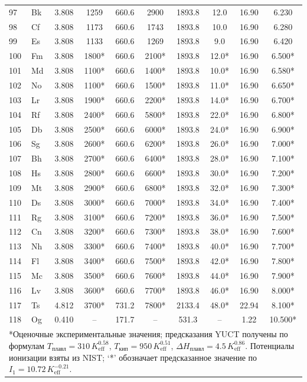 \documentclass[12pt,a4paper]{article}
\theoremstyle{remark}
\begin{document}
\begin{longtable}{@{}llcccccccc@{}}
		97 & Bk  & 3.808 & 1259   & 660.6  & 2900   & 1893.8 & 12.0  & 16.90 & 6.230 \\
		98 & Cf  & 3.808 & 1173   & 660.6  & 1743   & 1893.8 & 10.0  & 16.90 & 6.280 \\
		99 & Es  & 3.808 & 1133   & 660.6  & 1269   & 1893.8 & 9.0   & 16.90 & 6.420 \\
		100& Fm  & 3.808 & 1800*  & 660.6  & 2100*  & 1893.8 & 12.0* & 16.90 & 6.500* \\
		101& Md  & 3.808 & 1100*  & 660.6  & 1400*  & 1893.8 & 10.0* & 16.90 & 6.580* \\
		102& No  & 3.808 & 1100*  & 660.6  & 1500*  & 1893.8 & 11.0* & 16.90 & 6.650* \\
		103& Lr  & 3.808 & 1900*  & 660.6  & 2200*  & 1893.8 & 14.0* & 16.90 & 6.700* \\
		104& Rf  & 3.808 & 2400*  & 660.6  & 5800*  & 1893.8 & 22.0* & 16.90 & 6.800* \\
		105& Db  & 3.808 & 2500*  & 660.6  & 6000*  & 1893.8 & 24.0* & 16.90 & 6.900* \\
		106& Sg  & 3.808 & 2600*  & 660.6  & 6200*  & 1893.8 & 26.0* & 16.90 & 7.000* \\
		107& Bh  & 3.808 & 2700*  & 660.6  & 6400*  & 1893.8 & 28.0* & 16.90 & 7.100* \\
		108& Hs  & 3.808 & 2800*  & 660.6  & 6600*  & 1893.8 & 30.0* & 16.90 & 7.200* \\
		109& Mt  & 3.808 & 2900*  & 660.6  & 6800*  & 1893.8 & 32.0* & 16.90 & 7.300* \\
		110& Ds  & 3.808 & 3000*  & 660.6  & 7000*  & 1893.8 & 34.0* & 16.90 & 7.400* \\
		111& Rg  & 3.808 & 3100*  & 660.6  & 7200*  & 1893.8 & 36.0* & 16.90 & 7.500* \\
		112& Cn  & 3.808 & 3200*  & 660.6  & 7300*  & 1893.8 & 38.0* & 16.90 & 7.600* \\
		113& Nh  & 3.808 & 3300*  & 660.6  & 7400*  & 1893.8 & 40.0* & 16.90 & 7.700* \\
		114& Fl  & 3.808 & 3400*  & 660.6  & 7500*  & 1893.8 & 42.0* & 16.90 & 7.800* \\
		115& Mc  & 3.808 & 3500*  & 660.6  & 7600*  & 1893.8 & 44.0* & 16.90 & 7.900* \\
		116& Lv  & 3.808 & 3600*  & 660.6  & 7700*  & 1893.8 & 46.0* & 16.90 & 8.000* \\
		117& Ts  & 4.812 & 3700*  & 731.2  & 7800*  & 2133.4 & 48.0* & 22.94 & 8.100* \\
		118& Og  & 0.410 & --     & 171.7  & --     & 531.3  & --    & 1.22  & 10.500* \\
		\bottomrule
		\multicolumn{10}{p{0.9\textwidth}}{\footnotesize
			*Оценочные экспериментальные значения; предсказания YUCT получены по формулам \(T_{\text{плавл}}=310\,K_{\mathrm{eff}}^{0.58}\), 
			\(T_{\text{кип}}=950\,K_{\mathrm{eff}}^{0.51}\), 
			\(\Delta H_{\text{плавл}}=4.5\,K_{\mathrm{eff}}^{0.86}\).  
			Потенциалы ионизации взяты из NIST; `*' обозначает предсказанное значение по \(I_1 = 10.72\,K_{\mathrm{eff}}^{-0.21}\).}
	\end{longtable}
	
\end{document}
